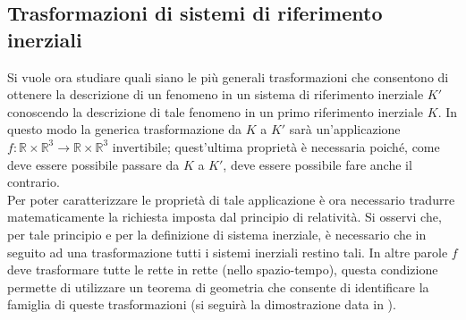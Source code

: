 \subsection{Trasformazioni di sistemi di riferimento inerziali}
Si vuole ora studiare quali siano le più generali trasformazioni che consentono di ottenere la descrizione di un fenomeno in un sistema di riferimento inerziale $K'$ conoscendo la descrizione di tale fenomeno in un primo riferimento inerziale $K$. In questo modo la generica trasformazione da $K$ a $K'$ sarà un'applicazione $f:\mathbb{R}\times \mathbb{R}^3\rightarrow\mathbb{R}\times \mathbb{R}^3$ invertibile; quest'ultima proprietà è necessaria poiché, come deve essere possibile passare da $K$ a $K'$, deve essere possibile fare anche il contrario.\\
Per poter caratterizzare le proprietà di tale applicazione è ora necessario tradurre matematicamente la richiesta imposta dal principio di relatività. Si osservi che, per tale principio e per la definizione di sistema inerziale, è necessario che in seguito ad una trasformazione tutti i sistemi inerziali restino tali. In altre parole $f$ deve trasformare tutte le rette in rette (nello spazio-tempo), questa condizione permette di utilizzare un teorema di geometria che consente di identificare la famiglia di queste trasformazioni (si seguirà la dimostrazione data in \cite{LostThmOfGeometry}). 

